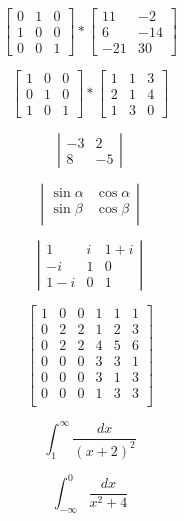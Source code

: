\documentclass[12pt, letterpaper, titlepage]{article}
\begin{document}
$$
\left[
\begin{array}{ccc}
0 & 1 & 0 \\
1 & 0 & 0 \\
0 & 0 & 1 
\end{array}
\right]
*
\left[
\begin{array}{cc}
11 & -2  \\
6 & -14  \\
-21 & 30  
\end{array} 
\right]$$

$$
\left[
\begin{array}{ccc}
1 & 0 & 0 \\
0 & 1 & 0 \\
1 & 0 & 1 
\end{array}
\right]
*
\left[
\begin{array}{ccc}
1 & 1 & 3 \\
2 & 1 & 4 \\
1 & 3 & 0 
\end{array} 
\right]$$

$$
\left|
\begin{array}{rr}
-3 & 2 \\
8 & -5
\end{array}
\right|$$

$$
\left|
\begin{array}{rr}
\sin \alpha & \cos \alpha \\
\sin \beta & \cos \beta \\
\end{array}
\right|$$

$$
\left|
\begin{array}{ccc}
1 & i & 1+i \\
-i & 1 & 0 \\
1-i & 0 & 1
\end{array}
\right|$$

$$
\left[
\begin{array}{c|cc|ccc}
1 & 0 & 0 & 1 & 1 & 1 \\
\hline
0 & 2 & 2 & 1 & 2 & 3 \\
0 & 2 & 2 & 4 & 5  & 6 \\
\hline
0 & 0 & 0 & 3 & 3 & 1 \\
0 & 0 & 0 & 3 & 1 & 3 \\
0& 0 & 0 & 1 & 3 & 3 \\
\end{array}
\right]$$

$$ \int^{\infty}_{1} \frac{dx}{(x+2)^{2}}$$

$$ \int^{0}_{-\infty} \frac{dx}{x^{2}+4}$$
\end{document}
